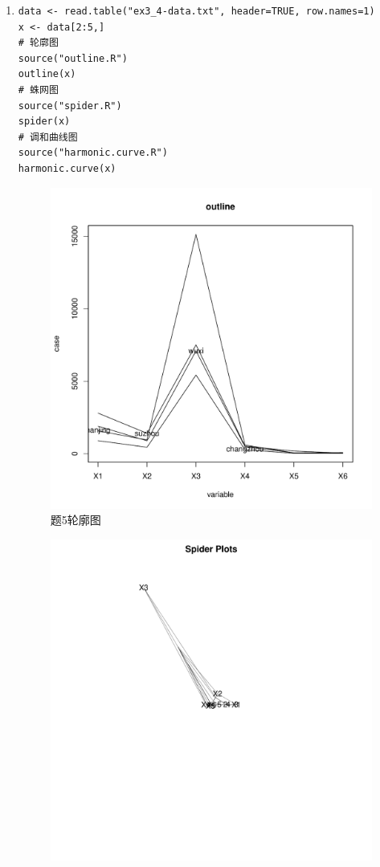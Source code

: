 \begin{enumerate}
        \item
        \code
\begin{lstlisting}
data <- read.table("ex3_4-data.txt", header=TRUE, row.names=1)
x <- data[2:5,]
# 轮廓图
source("outline.R")
outline(x)
# 蛛网图
source("spider.R")
spider(x)
# 调和曲线图
source("harmonic.curve.R")
harmonic.curve(x)
\end{lstlisting}
        \clearpage
        \out
        \begin{figure}[H]
            \centering
            \includegraphics[scale=0.4]{3-5轮廓图.pdf}
            \caption{题5轮廓图}
        \end{figure}
        \begin{figure}[H]
          \centering
            \includegraphics[scale=0.4]{3-5蛛网图.pdf}

\end{figure}
\end{enumerate}
